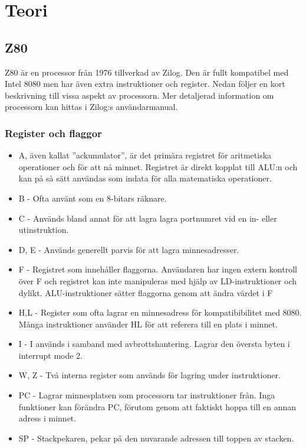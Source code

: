 \documentclass[main.tex]{subfiles}
\begin{document}
\section{Teori}
\subsection{Z80}
Z80 är en processor från 1976 tillverkad av Zilog. Den är fullt kompatibel med
Intel 8080 men har även extra instruktioner och register. Nedan följer en kort
beskrivning till vissa aspekt av processorn. Mer detaljerad information om
processorn kan hittas i Zilog:s användarmanual.
\cite{z80um}

\subsubsection{Register och flaggor}
\begin{itemize}
    \item A, även kallat ''ackumulator'', är det primära registret för
        aritmetiska operationer och för att nå minnet. Registret är direkt
        kopplat till ALU:n och kan på så sätt användas som indata för alla
        matematiska operationer.
    \item B - Ofta använt som en 8-bitars räknare.
    \item C - Används bland annat för att lagra lagra portnumret vid en in-
        eller utinstruktion.
    \item D, E - Används generellt parvis för att lagra minnesadresser.
    \item F - Registret som innehåller flaggorna. Användaren har ingen extern
        kontroll över F och registret kan inte manipuleras med hjälp av
        LD-instruktioner och dylikt. ALU-instruktioner sätter flaggorna genom
        att ändra värdet i F
    \item H,L - Register som ofta lagrar en minnesadress för kompatibibilitet
        med 8080. Många instruktioner använder HL för att referera till en
        plats i minnet.
    \item I - I används i samband med avbrottshantering. Lagrar den översta
        byten i interrupt mode 2.
    \item W, Z - Två interna register som används för lagring under
        instruktioner.
    \item PC - Lagrar minnesplatsen som processorn tar
        instruktioner från. Inga funktioner kan förändra PC, förutom genom att
        faktiskt hoppa till en annan adress i minnet.
    \item SP - Stackpekaren, pekar på den nuvarande adressen till toppen av
        stacken.
\end{itemize}
\end{document}
